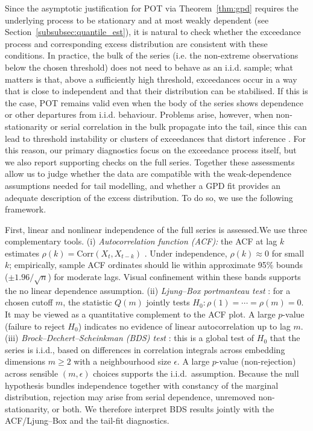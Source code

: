 \documentclass{statsmsc}
\begin{document}
Since the asymptotic justification for POT via Theorem~\ref{thm:gpd} requires the underlying process to be stationary
and at most weakly dependent (see Section~\ref{subsubsec:quantile_est}), it is natural to check whether the exceedance
process and corresponding excess distribution are consistent with these conditions. In practice, the bulk of the series
(i.e. the non-extreme observations below the chosen threshold) does not need to behave as an i.i.d. sample; what matters
is that, above a sufficiently high threshold, exceedances occur in a way that is close to independent and that their 
distribution can be stabilised. If this is the case, POT remains valid even when the body of the series shows dependence
or other departures from i.i.d. behaviour. Problems arise, however, when non-stationarity or serial correlation in the 
bulk propagate into the tail, since this can lead to threshold instability or clusters of exceedances that distort inference
\citep{leadbetter1983extremes,embrechts1997modelling,resnick2007heavy}. For this reason, our primary diagnostics focus on 
the exceedance process itself, but we also report supporting checks on the full series. Together these assessments allow
us to judge whether the data are compatible with the weak-dependence assumptions needed for tail modelling, and whether 
a GPD fit provides an adequate description of the excess distribution. To do so, we use the following framework.

First, linear and nonlinear independence of the full series is assessed.We use three complementary tools. 
(i) \emph{Autocorrelation function (ACF):} the ACF at lag $k$ estimates 
$\rho(k)=\mathrm{Corr}(X_t,X_{t-k})$ \citep{brockwelldavis1991}. 
Under independence, $\rho(k)\approx 0$ for small $k$; empirically, sample ACF ordinates should lie within 
approximate 95\% bounds ($\pm 1.96/\sqrt{n}$) for moderate lags. Visual confinement within these bands supports 
the no linear dependence assumption. 
(ii) \emph{Ljung--Box portmanteau test} \citep{ljung1978measure}: for a chosen cutoff $m$, 
the statistic $Q(m)$ jointly tests $H_0:\rho(1)=\cdots=\rho(m)=0$. It may be viewed as a quantitative complement 
to the ACF plot. A large $p$-value (failure to reject $H_0$) indicates no evidence of linear autocorrelation 
up to lag $m$. 
(iii) \emph{Brock--Dechert--Scheinkman (BDS) test} \citep{brock1996test}: this is a global test of 
$H_0$ that the series is i.i.d., based on differences in correlation integrals across embedding 
dimensions $m\ge 2$ with a neighbourhood size $\epsilon$. A large $p$-value (non-rejection) across sensible 
$(m,\epsilon)$ choices supports the i.i.d.\ assumption. Because the null hypothesis bundles independence together with 
constancy of the marginal distribution, rejection may arise from serial dependence, unremoved 
non-stationarity, or both. We therefore interpret BDS results jointly with the ACF/Ljung--Box and the 
tail-fit diagnostics.
\end{document}
